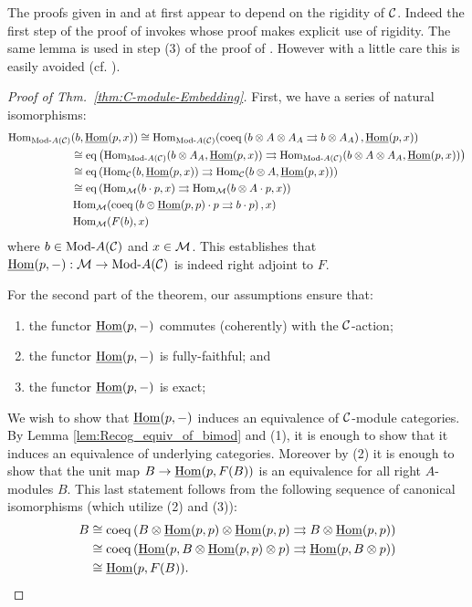 \documentclass{amsart}
\begin{document}
\noindent The proofs given in \cite{EGNO} and \cite{MR1976459} at first appear to depend on  the rigidity of $\mathcal C$. Indeed the first step of the proof of \cite[Thm 2.11.2]{EGNO} invokes \cite[lemma 2.10.4.(4)]{EGNO} whose proof makes explicit use of rigidity. The same lemma is used in step (3) of the proof of \cite[Thm 1]{MR1976459}. However with a little care this is easily avoided (cf. \cite[Rmk. 2.11.3]{EGNO}). 

\begin{proof}[Proof of Thm.~\ref{thm:C-module-Embedding}]
	First, we have a series of natural isomorphisms:
	\begin{align*}
		\Hom_{\Mod{}{A}(\cC)}&(b, \IHom(p,x))  \cong \Hom_{\Mod{}{A}(\cC)}( \coeq \left( b \otimes A \otimes A_A \rightrightarrows b \otimes A_A  \right), \IHom(p,x)) \\
		& \cong \eq \left( \Hom_{\Mod{}{A}(\cC)}(b \otimes A_A, \IHom(p,x) )  \rightrightarrows \Hom_{\Mod{}{A}(\cC)}(  b \otimes A \otimes A_A, \IHom(p,x))  \right) \\
		& \cong \eq \left( \Hom_{\cC}(b, \IHom(p,x) )  \rightrightarrows \Hom_{\cC}(  b \otimes A, \IHom(p,x))  \right) \\
		& \cong \eq \left( \Hom_{\cM}(b \cdot p, x )  \rightrightarrows \Hom_{\cM}(  b \otimes A \cdot p, x)  \right) \\
		& \Hom_{\cM}( \coeq \left( b \otimes \IHom(p,p) \cdot p \rightrightarrows b \cdot p \right), x) \\
		& \Hom_{\cM}( F(b), x)
	\end{align*}
	where $b \in \Mod{}{A}(\cC)$ and $x \in \mathcal M$. This establishes that $\IHom(p,-): \cM \to \Mod{}{A}(\cC)$ is indeed right adjoint to $F$.

For the second part of the theorem, our assumptions ensure that:
\begin{enumerate}
	\item the functor $\operatorname{\underline{Hom}}(p, -)$ commutes (coherently) with the $\mathcal C$-action;
	\item the functor $\operatorname{\underline{Hom}}(p, -)$ is fully-faithful; and
	\item the functor $\operatorname{\underline{Hom}}(p, -)$ is exact; 
\end{enumerate}
We wish to show that $\operatorname{\underline{Hom}}(p, -)$ induces an equivalence of $\mathcal C$-module categories. By Lemma \ref{lem:Recog_equiv_of_bimod} and (1), it is enough to show that it induces an equivalence of underlying categories. Moreover by (2) it is enough to show that the unit map $B \to \operatorname{\underline{Hom}}(p, F(B))$ is an equivalence for all right $A$-modules $B$. This last statement follows from the following sequence of canonical isomorphisms (which utilize (2) and (3)):
\begin{align*}
	B & \cong \operatorname{coeq} \left( B \otimes \operatorname{\underline{Hom}}(p,p) \otimes \operatorname{\underline{Hom}}(p,p) \rightrightarrows B \otimes \operatorname{\underline{Hom}}(p,p) \right)\\
	& \cong \operatorname{coeq} \left(\operatorname{\underline{Hom}}(p,B  \otimes \operatorname{\underline{Hom}}(p,p) \otimes p) \rightrightarrows \operatorname{\underline{Hom}}(p,B \otimes p) \right)\\
	& \cong \operatorname{\underline{Hom}}(p, F(B)).
\end{align*}	
\end{proof}
\end{document}
